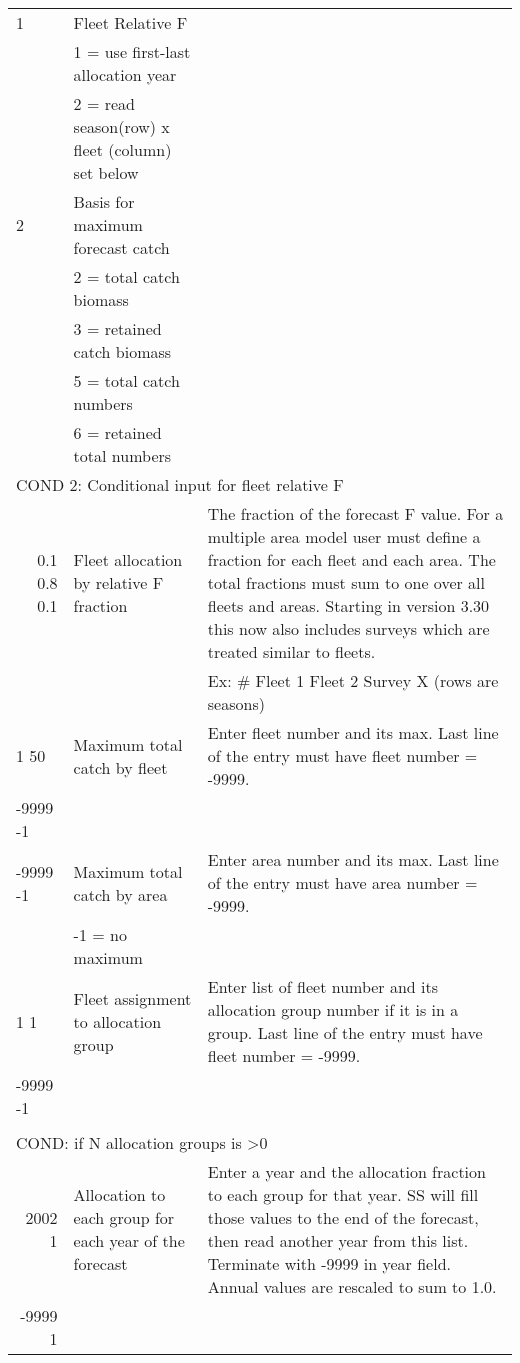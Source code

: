 \begin{landscape}
{\begin{longtable}{p{3.2cm} p{7cm} p{10.8cm}}
 \hline
 1 & Fleet Relative F & \Tstrut\\
   & 1 = use first-last allocation year & \\
   & 2 = read season(row) x fleet (column) set below & \Bstrut\\

 \hline 
 2 & Basis for maximum forecast catch &  \Tstrut\\
   & 2 = total catch biomass & \\
   & 3 = retained catch biomass & \\
   & 5 = total catch numbers & \\
   & 6 = retained total numbers & \Bstrut\\
    
 \hline 
 \multicolumn{3}{l}{COND 2: Conditional input for fleet relative F} \Tstrut\\
 \multicolumn{1}{r}{0.1 0.8 0.1}  & Fleet allocation by relative F fraction & The fraction of the forecast F value.  For a multiple area model user must define a fraction for each fleet and each area.  The total fractions must sum to one over all fleets and areas. Starting in version 3.30 this now also includes surveys which are treated similar to fleets.\\
   &  &  Ex: \# Fleet 1  Fleet 2  Survey X (rows are seasons) \Bstrut\\ 

  \hline
  1 50 & Maximum total catch by fleet & \multirow{1}{1cm}[-0.25cm]{\parbox{11cm}{Enter fleet number and its max. Last line of the entry must have fleet number = -9999.}} \Tstrut\\
  -9999 -1 & & \Bstrut\\
  \hline
  
  -9999 -1 & Maximum total catch by area & \multirow{1}{1cm}[-0.25cm]{\parbox{11cm}{Enter area number and its max. Last line of the entry must have area number = -9999.}} \Tstrut\\
     & -1 = no maximum & \Bstrut\\
     
  \hline
  1 1  & Fleet assignment to allocation group & \multirow{1}{1cm}[-0.25cm]{\parbox{11cm}{Enter list of fleet number and its allocation group number if it is in a group. Last line of the entry must have fleet number = -9999.}} \Tstrut\\
  -9999 -1  & &  \\ \Bstrut\\ 
    
  \hline
  \multicolumn{3}{l}{COND: if N allocation groups is >0 } \Tstrut\\
  \multicolumn{1}{r}{2002 1}  & Allocation to each group for each year of the forecast & Enter a year and the allocation fraction to each group for that year.  SS will fill those values to the end of the forecast, then read another year from this list.  Terminate with -9999 in year field. Annual values are rescaled to sum to 1.0. \\
  \multicolumn{1}{r}{-9999 1} & & \Bstrut\\
  

\end{longtable}}
\end{landscape}
